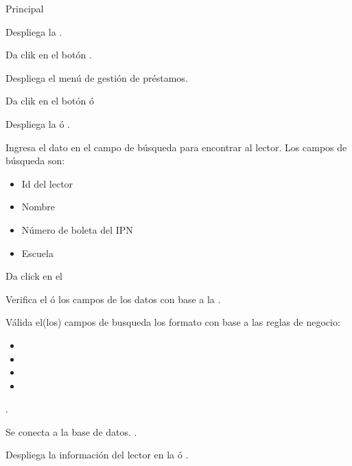 	\begin{UCtrayectoria}{Principal}
	
		\UCpaso Despliega la .

		\UCpaso[\UCactor] Da clik en el botón .

		\UCpaso Despliega el menú de gestión de préstamos. 

		\UCpaso[\UCactor] Da clik en el botón  ó 

		\UCpaso Despliega la  ó .

		\UCpaso[\UCactor] Ingresa el dato en el campo de búsqueda para encontrar al lector. Los campos de búsqueda son:
			\begin{itemize}
				\item  Id del lector
				\item  Nombre
				\item  Número de boleta del IPN
				\item  Escuela
			\end{itemize}
		\label{CU4.1BuscarLector}

		\UCpaso[\UCactor] Da click en el \label{CU4.2ConectarBaseDatos}


		\UCpaso Verifica el ó los campos de los datos con base a la  .

		\UCpaso Válida el(los) campos de busqueda los formato con base a las reglas de negocio: 
				
			\begin{itemize}
				\item   {}
				\item 	{}
				\item	{} 
				\item	{} 
			\end{itemize} 
		.

		\UCpaso Se conecta a la base de datos. .

		\UCpaso Despliega la información del lector en la  ó .


\end{UCtrayectoria}
